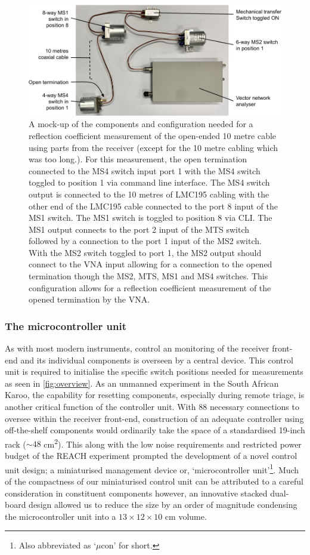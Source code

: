 \begin{figure}
    \centering
    \includegraphics[width=\textwidth]{switch_example}
    \caption{A mock-up of the components and configuration needed for a reflection coefficient measurement of the open-ended 10 metre cable using parts from the receiver (except for the 10 metre cabling which was too long.). For this measurement, the open termination connected to the MS4 switch input port 1 with the MS4 switch toggled to position 1 via command line interface. The MS4 switch output is connected to the 10 metres of LMC195 cabling with the other end of the LMC195 cable connected to the port 8 input of the MS1 switch. The MS1 switch is toggled to position 8 via CLI. The MS1 output connects to the port 2 input of the MTS switch followed by a connection to the port 1 input of the MS2 switch. With the MS2 switch toggled to port 1, the MS2 output should connect to the VNA input allowing for a connection to the opened termination though the MS2, MTS, MS1 and MS4 switches. This configuration allows for a reflection coefficient measurement of the opened termination by the VNA.}
    \label{fig:switch_mock}
\end{figure}


\subsubsection{The microcontroller unit}
As with most modern instruments, control an monitoring of the receiver front-end and its individual components is overseen by a central device. This control unit is required to initialise the specific switch positions needed for measurements as seen in \cref{fig:overview}. As an unmanned experiment in the South African Karoo, the capability for resetting components, especially during remote triage, is another critical function of the controller unit. With 88 necessary connections to oversee within the receiver front-end, construction of an adequate controller using off-the-shelf components would ordinarily take the space of a standardised 19-inch rack ($\sim 48$ cm\textsuperscript{2}). This along with the low noise requirements and restricted power budget of the REACH experiment prompted the development of a novel control unit design; a miniaturised management device or, ‘microcontroller unit’\footnote{Also abbreviated as ‘$\mu$con’ for short.}. Much of the compactness of our miniaturised control unit can be attributed to a careful consideration in constituent components however, an innovative stacked dual-board design allowed us to reduce the size by an order of magnitude condensing the microcontroller unit into a $13 \times 12 \times 10$ cm volume.

